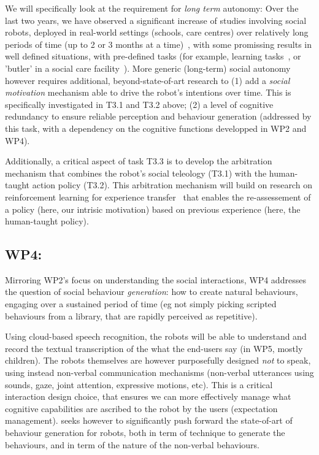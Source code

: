 We will specifically look at the requirement for \emph{long term} autonomy: Over
the last two years, we have observed a significant increase of studies
involving social robots, deployed in real-world settings (schools, care centres)
over relatively long periods of time (up to 2 or 3 months at a
time)~\cite{kunze2018artificial,leite2013social}, with some promissing results
in well defined situations, with pre-defined tasks (for example, learning
tasks~\cite{senft2019teaching}, or 'butler' in a social care
facility~\cite{hawes2017strands}). More generic (long-term) social autonomy
however requires additional, beyond-state-of-art research to (1) add a
\emph{social motivation} mechanism able to drive the robot's intentions over
time. This is specifically investigated in T3.1 and T3.2 above; (2) a level of
cognitive redundancy to ensure reliable perception and behaviour generation
(addressed by this task, with a dependency on the cognitive functions developped
in WP2 and WP4).

Additionally, a critical aspect of task T3.3 is to develop the arbitration
mechanism that combines the robot's social teleology (T3.1) with the human-taught
action policy (T3.2). This arbitration mechanism will build on research on
reinforcement learning for experience transfer~\cite{madden2004transfer} that
enables the re-assessement of a policy (here, our intrisic motivation) based on
previous experience (here, the human-taught policy).



\subsection{WP4: \textbf{\wpFour}} 


Mirroring WP2's focus on understanding the social interactions, WP4 addresses the
question of social behaviour \emph{generation}: how to create natural
behaviours, engaging over a sustained period of time (eg not simply picking
scripted behaviours from a library, that are rapidly perceived as repetitive).

Using cloud-based speech recognition, the robots will be able to understand and
record the textual transcription of the what the end-users say (in WP5, mostly
children). The robots themselves are however purposefully designed \emph{not} to
speak, using instead non-verbal communication mechanisms (non-verbal utterances
using sounds, gaze, joint attention, expressive motions, etc). This is a
critical interaction design choice, that ensures we can more effectively manage
what cognitive capabilities are ascribed to the robot by the users (expectation
management).  \project seeks however to significantly push forward the
state-of-art of behaviour generation for robots, both in term of technique to
generate the behaviours, and in term of the nature of the non-verbal behaviours.

